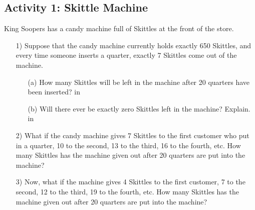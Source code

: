 \documentclass[11pt]{exam}
\begin{document}

\subsection*{Activity 1: Skittle Machine}
King Soopers has a candy machine full of Skittles at the front of the store.
\begin{itemize}
\item[1)] Suppose that the candy machine currently holds exactly 650 Skittles, and every time someone inserts a quarter, exactly 7 Skittles come out of the machine. 
\begin{itemize}
\item[(a)]How many Skittles will be left in the machine after 20 quarters have been inserted?
 in
\item[(b)] Will there ever be exactly zero Skittles left in the machine? Explain.
 in
\end{itemize}
\item[2)] What if the candy machine gives 7 Skittles to the first customer who put in a quarter, 10 to the second, 13 to the third, 16 to the fourth, etc. How many Skittles has the machine given out after 20 quarters are put into the machine?
\vfill
\item[3)] Now, what if the machine gives 4 Skittles to the first customer, 7 to the second, 12 to the third, 19 to the fourth, etc. How many Skittles has the machine given out after 20 quarters are put into the machine?
\end{itemize}
\vfill
\end{document}
